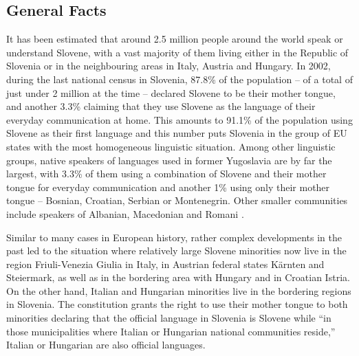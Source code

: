 \clearpage


\begin{multicols}{2}

\subsection{General Facts}

It has been estimated that around 2.5 million people around the world speak or understand Slovene, with a vast majority of them living either in the Republic of Slovenia or in the neighbouring areas in Italy, Austria and Hungary. In 2002, during the last national census in Slovenia, 87.8\% of the population – of a total of just under 2 million at the time – declared Slovene to be their mother tongue, and another 3.3\% claiming that they use Slovene as the language of their everyday communication at home. This amounts to 91.1\% of the population using Slovene as their first language and this number puts Slovenia in the group of EU states with the most homogeneous linguistic situation. Among other linguistic groups, native speakers of languages used in former Yugoslavia are by far the largest, with 3.3\% of them using a combination of Slovene and their mother tongue for everyday communication and another 1\% using only their mother tongue – Bosnian, Croatian, Serbian or Montenegrin. Other smaller communities include speakers of Albanian, Macedonian and Romani \cite{SURS1}.


Similar to many cases in European history, rather complex developments in the past led to the situation where relatively large Slovene minorities now live in the region Friuli-Venezia Giulia in Italy, in Austrian federal states Kärnten and Steiermark, as well as in the bordering area with Hungary and in Croatian Istria. On the other hand, Italian and Hungarian minorities live in the bordering regions in Slovenia. The constitution grants the right to use their mother tongue to both minorities declaring that the official language in Slovenia is Slovene while ``in those municipalities where Italian or Hungarian national communities reside,'' Italian or Hungarian are also official languages. 


\end{multicols}
